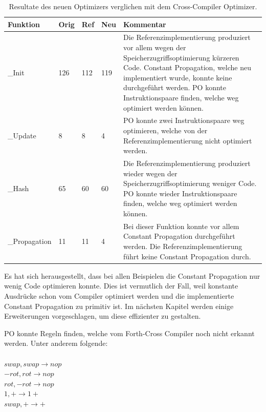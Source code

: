 \begin{table}[H]
\begin{center}
    \begin{tabular}{ | l | l | l | l | p{8cm} |}
    \hline
    \textbf{Funktion} & \textbf{Orig} & \textbf{Ref} & \textbf{Neu} & \textbf{Kommentar} \\ \hline
    \_Init & 126 & 112 & 119 & Die Referenzimplementierung produziert vor allem wegen der Speicherzugriffsoptimierung kürzeren Code. Constant Propagation, welche neu implementiert wurde, konnte keine durchgeführt werden. PO konnte Instruktionspaare finden, welche weg optimiert werden können.  \\ \hline
		\_Update & 8 & 8 & 4 & PO konnte zwei Instruktionspaare weg optimieren, welche von der Referenzimplementierung nicht optimiert werden. \\ \hline
		\_Hash & 65 & 60 & 60 & Die Referenzimplementierung produziert wieder wegen der Speicherzugriffsoptimierung weniger Code. PO konnte wieder Instruktionspaare finden, welche weg optimiert werden können. \\ \hline
		\_Propagation & 11 & 11 & 4 & Bei dieser Funktion konnte vor allem Constant Propagation durchgeführt werden. Die Referenzimplementierung führt keine Constant Propagation durch. \\ \hline
    \end{tabular}
		\caption{Resultate des neuen Optimizers verglichen mit dem Cross-Compiler Optimizer.}
		\label{tab:peepresults}
\end{center}
\end{table}
\newpage

Es hat sich herausgestellt, dass bei allen Beispielen die Constant Propagation nur wenig Code optimieren konnte. Dies ist vermutlich der Fall, weil konstante Ausdrücke schon vom Compiler optimiert werden und die implementierte Constant Propagation zu primitiv ist. Im nächsten Kapitel werden einige Erweiterungen vorgeschlagen, um diese effizienter zu gestalten.  

PO konnte Regeln finden, welche vom Forth-Cross Compiler noch nicht erkannt werden. Unter anderem folgende:\\ \\
%
$swap, swap \rightarrow nop$\\
$-rot, rot \rightarrow nop$\\
$rot, -rot \rightarrow nop$\\
$1, + \rightarrow 1+$\\
$swap, + \rightarrow +$\\
%

